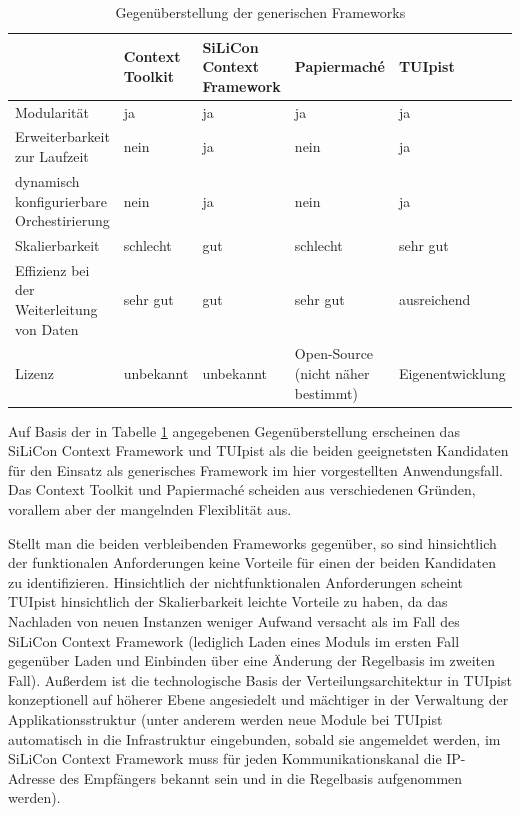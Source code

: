 \begin{table}[htbp]
	\begin{tabular}{| p{3cm} || p{2cm} | p{2cm} | p{2cm} | p{2cm} |} \hline
		 & Context Toolkit & SiLiCon Context Framework & Papiermaché & TUIpist \\ \hline \hline
		Modularität & ja & ja & ja & ja \\ \hline
		Erweiterbarkeit zur Laufzeit & nein & ja & nein & ja \\ \hline
		dynamisch konfigurierbare Orchestirierung & nein & ja & nein & ja \\ \hline
		Skalierbarkeit & schlecht & gut & schlecht & sehr gut \\ \hline
		Effizienz bei der Weiterleitung von Daten & sehr gut & gut & sehr gut & ausreichend \\ \hline
		Lizenz & unbekannt & unbekannt & Open-Source (nicht näher bestimmt) & Eigen\-entwicklung \\ \hline
	\end{tabular}
	\caption{Gegenüberstellung der generischen Frameworks}
	\label{tab:generischeFrameworks}
\end{table}

Auf Basis der in Tabelle \ref{tab:generischeFrameworks} angegebenen Gegenüberstellung erscheinen das SiLiCon Context Framework und TUIpist als die beiden geeignetsten Kandidaten für den Einsatz als generisches Framework im hier vorgestellten Anwendungsfall. Das Context Toolkit und Papiermaché scheiden aus verschiedenen Gründen, vorallem aber der mangelnden Flexiblität aus.

Stellt man die beiden verbleibenden Frameworks gegenüber, so sind hinsichtlich der funktionalen Anforderungen keine Vorteile für einen der beiden Kandidaten zu identifizieren. Hinsichtlich der nichtfunktionalen Anforderungen scheint TUIpist hinsichtlich der Skalierbarkeit leichte Vorteile zu haben, da das Nachladen von neuen Instanzen weniger Aufwand versacht als im Fall des SiLiCon Context Framework (lediglich Laden eines Moduls im ersten Fall gegenüber Laden und Einbinden über eine Änderung der Regelbasis im zweiten Fall). Außerdem ist die technologische Basis der Verteilungsarchitektur in TUIpist konzeptionell auf höherer Ebene angesiedelt und mächtiger in der Verwaltung der Applikationsstruktur (unter anderem werden neue Module bei TUIpist automatisch in die Infrastruktur eingebunden, sobald sie angemeldet werden, im SiLiCon Context Framework muss für jeden Kommunikationskanal die IP-Adresse des Empfängers bekannt sein und in die Regelbasis aufgenommen werden). 

